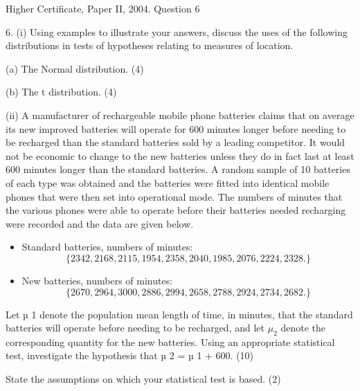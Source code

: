 \documentclass[a4paper,12pt]{article}
\begin{document}
Higher Certificate, Paper II, 2004. Question 6

\begin{framed}

6. (i) Using examples to illustrate your answers, discuss the uses of the following distributions in tests of hypotheses relating to measures of location. 
 
(a) The Normal distribution. 
(4) 
 
(b) The t distribution. 
(4) 
 
 
(ii) A manufacturer of rechargeable mobile phone batteries claims that on average its new improved batteries will operate for 600 minutes longer before needing to be recharged than the standard batteries sold by a leading competitor.  It would not be economic to change to the new batteries unless they do in fact last at least 600 minutes longer than the standard batteries.  A random sample of 10 batteries of each type was obtained and the batteries were fitted into identical mobile phones that were then set into operational mode.  The numbers of minutes that the various phones were able to operate before their batteries needed recharging were recorded and the data are given below. 
 
 \begin{itemize}
     \item    Standard batteries, numbers of minutes: 
\[\{ 2342,   2168,   2115,   1954,   2358,   2040,   1985,   2076,   2224,   2328. \}\]
 
\item   New batteries, numbers of minutes: 
\[\{ 2670,   2964,   3000,   2886,   2994,   2658,   2788,   2924,   2734,   2682. \}\]
 \end{itemize}

 
Let µ 1 denote the population mean length of time, in minutes, that the standard batteries will operate before needing to be recharged, and let $\mu_2$ denote the corresponding quantity for the new batteries.  Using an appropriate statistical test, investigate the hypothesis that µ 2 = µ 1 + 600. (10) 
 
State the assumptions on which your statistical test is based. 
(2) 

\end{framed}
\end{document}
